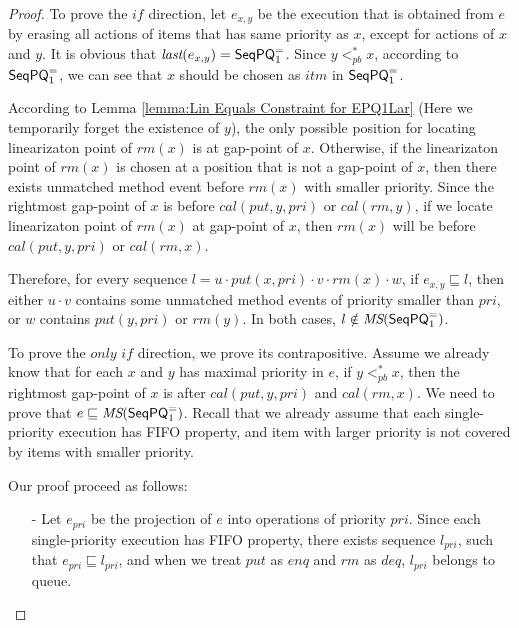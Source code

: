 \begin {proof}

To prove the $\textit{if}$ direction, let $e_{x,y}$ be the execution that is obtained from $e$ by erasing all actions of items that has same priority as $x$, except for actions of $x$ and $y$. It is obvious that $\textit{last}(e_{x,y}) = \mathsf{SeqPQ}_1^{=}$. Since $y <_{\textit{pb}}^* x$, according to $\mathsf{SeqPQ}_1^{=}$, we can see that $x$ should be chosen as $\textit{itm}$ in $\mathsf{SeqPQ}_1^{=}$.

According to Lemma \ref{lemma:Lin Equals Constraint for EPQ1Lar} (Here we temporarily forget the existence of $y$), the only possible position for locating linearizaton point of $\textit{rm}(x)$ is at gap-point of $x$. Otherwise, if the linearizaton point of $\textit{rm}(x)$ is chosen at a position that is not a gap-point of $x$, then there exists unmatched method event before $\textit{rm}(x)$ with smaller priority. Since the rightmost gap-point of $x$ is before $\textit{cal}(\textit{put},y,\textit{pri})$ or $\textit{cal}(\textit{rm},y)$, if we locate linearizaton point of $\textit{rm}(x)$ at gap-point of $x$, then $\textit{rm}(x)$ will be before $\textit{cal}(\textit{put},y,\textit{pri})$ or $\textit{cal}(\textit{rm},x)$.

Therefore, for every sequence $l = u \cdot \textit{put}(x,\textit{pri}) \cdot v \cdot \textit{rm}(x) \cdot w$, if $e_{x,y} \sqsubseteq l$, then either $u \cdot v$ contains some unmatched method events of priority smaller than $\textit{pri}$, or $w$ contains $\textit{put}(y,\textit{pri})$ or $\textit{rm}(y)$. In both cases, $l \notin \textit{MS}(\mathsf{SeqPQ}_1^{=})$.

To prove the $\textit{only if}$ direction, we prove its contrapositive. Assume we already know that for each $x$ and $y$ has maximal priority in $e$, if $y <_{\textit{pb}}^* x$, then the rightmost gap-point of $x$ is after $\textit{cal}(\textit{put},y,\textit{pri})$ and $\textit{cal}(\textit{rm},x)$. We need to prove that $e \sqsubseteq \textit{MS}(\mathsf{SeqPQ}_1^{=})$. Recall that we already assume that each single-priority execution has FIFO property, and item with larger priority is not covered by items with smaller priority.

Our proof proceed as follows:

\begin{itemize}
\setlength{\itemsep}{0.5pt}
\item[-] Let $e_{\textit{pri}}$ be the projection of $e$ into operations of priority $\textit{pri}$. Since each single-priority execution has FIFO property, there exists sequence $l_{\textit{pri}}$, such that $e_{\textit{pri}} \sqsubseteq l_{\textit{pri}}$, and when we treat $\textit{put}$ as $\textit{enq}$ and $\textit{rm}$ as $\textit{deq}$, $l_{\textit{pri}}$ belongs to queue.


\end{itemize}
\end{proof}
